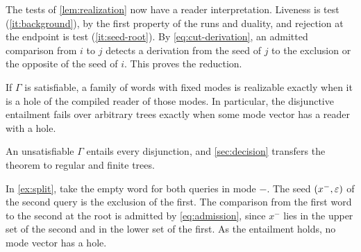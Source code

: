 The tests of \cref{lem:realization} now have a reader interpretation.
Liveness is test (\ref{it:background}), by the first property of the runs
and duality, and rejection at the endpoint is test (\ref{it:seed-root}).
By \eqref{eq:cut-derivation}, an admitted comparison from $i$ to $j$
detects a derivation from the seed of $j$ to the exclusion or the opposite
of the seed of $i$. This proves the reduction.

\begin{theorem}\label{thm:reduction}
If $\Gamma$ is satisfiable, a family of words with fixed modes is
realizable exactly when it is a hole of the compiled reader of those
modes. In particular, the disjunctive entailment fails over arbitrary
trees exactly when some mode vector has a reader with a hole.
\end{theorem}

An unsatisfiable $\Gamma$ entails every disjunction, and \cref{sec:decision}
transfers the theorem to regular and finite trees.

In \cref{ex:split}, take the empty word for both queries in mode $-$.
The seed $(x^-,\varepsilon)$ of the second query is the exclusion of the first.
The comparison from the first word to the second at the root is admitted
by \eqref{eq:admission}, since $x^-$ lies in the upper set of the second
and in the lower set of the first. As the entailment holds, no mode vector
has a hole.

